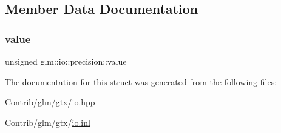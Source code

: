 \subsection{Member Data Documentation}
\mbox{\label{structglm_1_1io_1_1precision_a43da772dff9a209768c63f1220d52074}} 
\subsubsection{\texorpdfstring{value}{value}}
{\footnotesize\ttfamily unsigned glm\+::io\+::precision\+::value}



The documentation for this struct was generated from the following files\+:\begin{DoxyCompactItemize}
\item 
Contrib/glm/gtx/\mbox{\hyperlink{io_8hpp}{io.\+hpp}}\item 
Contrib/glm/gtx/\mbox{\hyperlink{io_8inl}{io.\+inl}}\end{DoxyCompactItemize}
